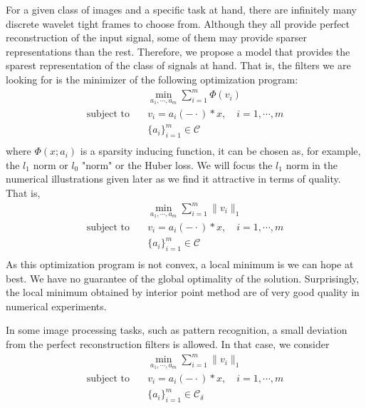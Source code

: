 \documentclass[a4paper]{article}
\begin{document}
For a given class of images and a specific task at hand, there are infinitely many discrete wavelet tight frames to choose from. Although they all provide perfect reconstruction of the input signal, some of them may provide sparser representations than the rest. Therefore, we propose a model that provides the sparest representation of the class of signals at hand. That is, the filters we are looking for is the minimizer of the following optimization program:
\begin{equation}
	\begin{aligned}
		&\min_{a_1,\cdots,a_m} \sum_{i=1}^m\Phi(v_i) \\
		\textrm{subject to} \quad&v_i = a_i(-\cdot)*x,\quad i=1,\cdots,m\\
		 & \{a_i\}_{i=1}^m \in \mathcal{C} \\
	\end{aligned}
\end{equation}
where $\Phi(x;a_i)$ is a sparsity inducing function, it can be chosen as, for example, the $l_1$ norm or $l_0$ "norm" or the Huber loss. We will focus the $l_1$ norm in the numerical illustrations given later as we find it attractive in terms of quality. That is,
\begin{equation}
\label{model:m0}
	\begin{aligned}
		&\min_{a_1,\cdots,a_m} \sum_{i=1}^m \|v_i\|_1 \\
		\textrm{subject to} \quad&v_i = a_i(-\cdot)*x,\quad i=1,\cdots,m\\
		 & \{a_i\}_{i=1}^m \in \mathcal{C} \\
	\end{aligned}
\end{equation}
As this optimization program is not convex, a local minimum is we can hope at best. We have no guarantee of the global optimality of the solution. Surprisingly, the local minimum obtained by interior point method are of very good quality in numerical experiments.

In some image processing tasks, such as pattern recognition, a small deviation from the perfect reconstruction filters is allowed. In that case, we consider
\begin{equation}
\label{model:m1}
	\begin{aligned}
		&\min_{a_1,\cdots,a_m} \sum_{i=1}^m \|v_i\|_1 \\
		\textrm{subject to} \quad&v_i = a_i(-\cdot)*x,\quad i=1,\cdots,m\\
		 & \{a_i\}_{i=1}^m \in \mathcal{C_\delta} \\
	\end{aligned}
\end{equation}
\end{document}
